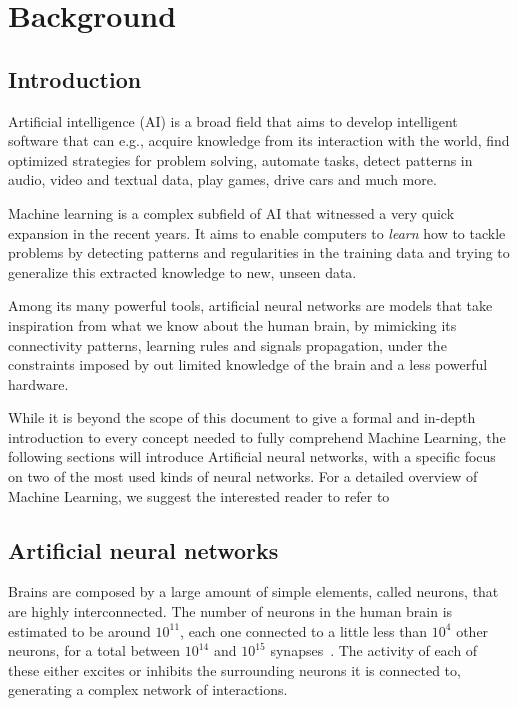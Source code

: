 \chapter{Background}\label{sec:background}

\section{Introduction}\label{sec:MLintro}
Artificial intelligence (AI) is a broad field that aims to develop intelligent
software that can e.g., acquire knowledge from its interaction with the world,
find optimized strategies for problem solving, automate tasks, detect patterns
in audio, video and textual data, play games, drive cars and much more.

Machine learning is a complex subfield of AI that witnessed a very quick
expansion in the recent years. It aims to enable computers to \emph{learn} how
to tackle problems by detecting patterns and regularities in the training data
and trying to generalize this extracted knowledge to new, unseen data.

Among its many powerful tools, artificial neural networks are models that take
inspiration from what we know about the human brain, by mimicking its
connectivity patterns, learning rules and signals propagation, under the
constraints imposed by out limited knowledge of the brain and a less powerful
hardware.

While it is beyond the scope of this document to give a formal and in-depth
introduction to every concept needed to fully comprehend Machine Learning,
the following sections will introduce Artificial neural networks, with a
specific focus on two of the most used kinds of neural networks. For a detailed
overview of Machine Learning, we suggest the interested reader to refer
to~\cite{bishop-book2006,Goodfellow-et-al-2016-Book}

\section{Artificial neural networks}\label{sec:NN}
Brains are composed by a large amount of simple elements, called neurons,
that are highly interconnected. The number of neurons in the human brain is
estimated to be around $10^{11}$, each one connected to a little less than
$10^{4}$ other neurons, for a total between $10^{14}$ and $10^{15}$
synapses~\cite{drachman2005we}. The activity of each of these either excites or
inhibits the surrounding neurons it is connected to, generating a complex
network of interactions.

